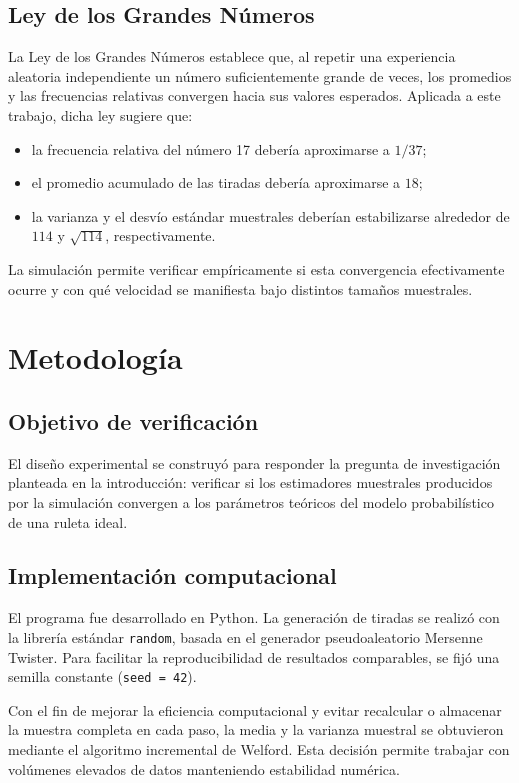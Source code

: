 \documentclass{article}
\begin{document}
\subsection{Ley de los Grandes Números}
La Ley de los Grandes Números establece que, al repetir una experiencia aleatoria independiente un número suficientemente grande de veces, los promedios y las frecuencias relativas convergen hacia sus valores esperados. Aplicada a este trabajo, dicha ley sugiere que:

\begin{itemize}
    \item la frecuencia relativa del número 17 debería aproximarse a $1/37$;
    \item el promedio acumulado de las tiradas debería aproximarse a $18$;
    \item la varianza y el desvío estándar muestrales deberían estabilizarse alrededor de $114$ y $\sqrt{114}$, respectivamente.
\end{itemize}

La simulación permite verificar empíricamente si esta convergencia efectivamente ocurre y con qué velocidad se manifiesta bajo distintos tamaños muestrales.

\section{Metodología}

\subsection{Objetivo de verificación}
El diseño experimental se construyó para responder la pregunta de investigación planteada en la introducción: verificar si los estimadores muestrales producidos por la simulación convergen a los parámetros teóricos del modelo probabilístico de una ruleta ideal.

\subsection{Implementación computacional}
El programa fue desarrollado en Python. La generación de tiradas se realizó con la librería estándar \texttt{random}, basada en el generador pseudoaleatorio Mersenne Twister. Para facilitar la reproducibilidad de resultados comparables, se fijó una semilla constante (\texttt{seed = 42}).

Con el fin de mejorar la eficiencia computacional y evitar recalcular o almacenar la muestra completa en cada paso, la media y la varianza muestral se obtuvieron mediante el algoritmo incremental de Welford. Esta decisión permite trabajar con volúmenes elevados de datos manteniendo estabilidad numérica.
\end{document}
